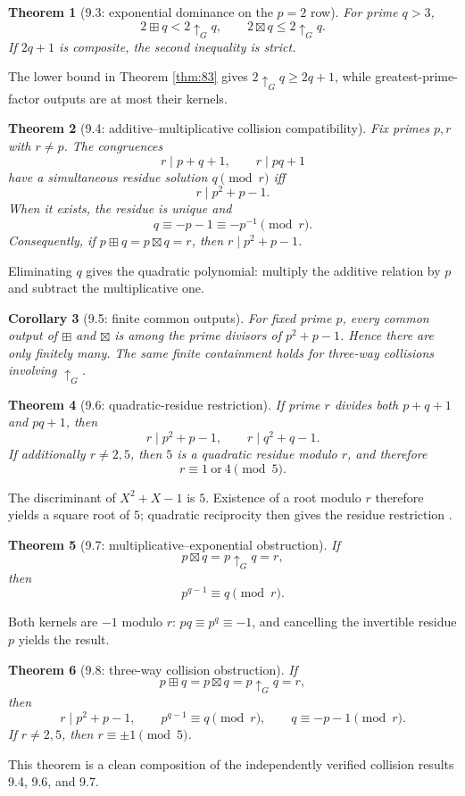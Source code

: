 \documentclass[11pt,a4paper,oneside,open=any,headings=small]{scrbook}
\newtheorem{theorem}{Theorem}[chapter]
\newtheorem{corollary}[theorem]{Corollary}
\theoremstyle{definition}
\newcommand{\gexp}{\mathbin{\uparrow_{G}}}
\begin{document}
\begin{theorem}[9.3: exponential dominance on the $p=2$ row]
For prime $q>3$,
\[
2\boxplus q<2\gexp q,
\qquad
2\boxtimes q\le2\gexp q.
\]
If $2q+1$ is composite, the second inequality is strict.
\end{theorem}
The lower bound in Theorem \ref{thm:83} gives $2\gexp q\ge2q+1$, while greatest-prime-factor outputs are at most their kernels.

\begin{theorem}[9.4: additive--multiplicative collision compatibility]\label{thm:94}
Fix primes $p,r$ with $r\ne p$. The congruences
\[
r\mid p+q+1,\qquad r\mid pq+1
\]
have a simultaneous residue solution $q\pmod r$ iff
\[
r\mid p^2+p-1.
\]
When it exists, the residue is unique and
\[
q\equiv-p-1\equiv-p^{-1}\pmod r.
\]
Consequently, if $p\boxplus q=p\boxtimes q=r$, then $r\mid p^2+p-1$.
\end{theorem}
Eliminating $q$ gives the quadratic polynomial: multiply the additive relation by $p$ and subtract the multiplicative one.

\begin{corollary}[9.5: finite common outputs]
For fixed prime $p$, every common output of $\boxplus$ and $\boxtimes$ is among the prime divisors of $p^2+p-1$. Hence there are only finitely many. The same finite containment holds for three-way collisions involving $\gexp$.
\end{corollary}

\begin{theorem}[9.6: quadratic-residue restriction]
If prime $r$ divides both $p+q+1$ and $pq+1$, then
\[
r\mid p^2+p-1,
\qquad
r\mid q^2+q-1.
\]
If additionally $r\ne2,5$, then $5$ is a quadratic residue modulo $r$, and therefore
\[
r\equiv1\ \text{or}\ 4\pmod5.
\]
\end{theorem}
The discriminant of $X^2+X-1$ is $5$. Existence of a root modulo $r$ therefore yields a square root of $5$; quadratic reciprocity then gives the residue restriction \parencite{IrelandRosen1990}.

\begin{theorem}[9.7: multiplicative--exponential obstruction]
If
\[
p\boxtimes q=p\gexp q=r,
\]
then
\[
p^{q-1}\equiv q\pmod r.
\]
\end{theorem}
Both kernels are $-1$ modulo $r$: $pq\equiv p^q\equiv-1$, and cancelling the invertible residue $p$ yields the result.

\begin{theorem}[9.8: three-way collision obstruction]
If
\[
p\boxplus q=p\boxtimes q=p\gexp q=r,
\]
then
\[
r\mid p^2+p-1,
\qquad p^{q-1}\equiv q\pmod r,
\qquad q\equiv-p-1\pmod r.
\]
If $r\ne2,5$, then $r\equiv\pm1\pmod5$.
\end{theorem}
This theorem is a clean composition of the independently verified collision results 9.4, 9.6, and 9.7.
\end{document}
